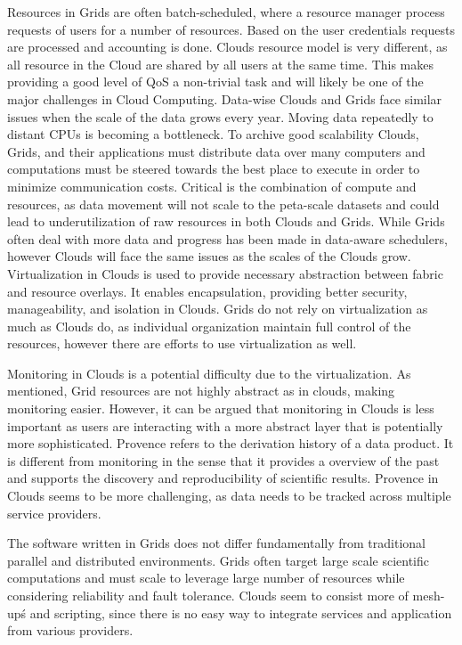 \documentclass{article}
\begin{document}
Resources in Grids are often batch-scheduled, where a resource manager process
requests of users for a number of resources. Based on the user credentials
requests are processed and accounting is done. Clouds resource model is very
different, as all resource in the Cloud are shared by all users at the same
time. This makes providing a good level of QoS a non-trivial task and will
likely be one of the major challenges in Cloud Computing. Data-wise Clouds and
Grids face similar issues when the scale of the data grows every year. Moving
data repeatedly to distant CPUs is becoming a bottleneck. To archive good
scalability Clouds, Grids, and their applications must distribute data over many
computers and computations must be steered towards the best place to execute in
order to minimize communication costs. Critical is the combination of compute
and resources, as data movement will not scale to the peta-scale datasets and
could lead to underutilization of raw resources in both Clouds and Grids. While
Grids often deal with more data and progress has been made in data-aware
schedulers, however Clouds will face the same issues as the scales of the Clouds
grow. Virtualization in Clouds is used to provide necessary abstraction between
fabric and resource overlays. It enables encapsulation, providing better
security, manageability, and isolation in Clouds. Grids do not rely on
virtualization as much as Clouds do, as individual organization maintain full
control of the resources, however there are efforts to use virtualization as
well.

Monitoring in Clouds is a potential difficulty due to the virtualization. As
mentioned, Grid resources are not highly abstract as in clouds, making
monitoring easier. However, it can be argued that monitoring in Clouds is less
important as users are interacting with a more abstract layer that is
potentially more sophisticated. Provence refers to the derivation history of a
data product. It is different from monitoring in the sense that it provides a
overview of the past and supports the discovery and reproducibility of
scientific results. Provence in Clouds seems to be more challenging, as data
needs to be tracked across multiple service providers.

The software written in Grids does not differ fundamentally from traditional
parallel and distributed environments. Grids often target large scale scientific
computations and must scale to leverage large number of resources while
considering reliability and fault tolerance. Clouds seem to consist more of
mesh-up\'s and scripting, since there is no easy way to integrate services and
application from various providers.
\end{document}
